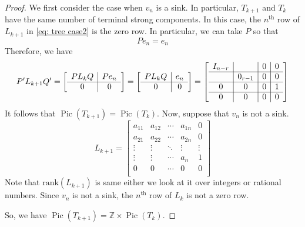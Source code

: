 \documentclass[11pt,reqno]{amsart}
\DeclareMathOperator{\Pic}{Pic}
\theoremstyle{definition}
\theoremstyle{plain}
\begin{document}
\begin{proof}
We first consider the case when $v_n$ is a sink. In particular, $T_{k+1}$ and $T_{k}$ have the same number of terminal strong components. In this case, the $n^{\textrm{th}}$ row of $L_{k+1}$ in \eqref{eq: tree case2} is the zero row. In particular, we can take $P$ so that
\begin{equation}
Pe_n=e_n
\end{equation}
Therefore, we have
\begin{equation}
P'L_{k+1}Q' = \left[\begin{array}{c|c}
	PL_kQ & Pe_n \\ \hline
	0 & 0
\end{array}\right] =\left[\begin{array}{c|c}
PL_kQ & e_n \\ \hline
0 & 0
\end{array}\right] =\left[\begin{array}{c|c|c|c}
I_{n-r} & & 0&0\\ \hline
   &0_{r-1} &0& 0\\ \hline
0 &0& 0&1\\ \hline
0 &0& 0&0\\
\end{array}\right]
\end{equation}
It follows that $\Pic(T_{k+1})=\Pic(T_k)$. Now, suppose that $v_n$ is not a sink.
\begin{equation}\label{eq: tree case3}
L_{k+1}=	\left[\begin{array}{ccc|c|c}
		a_{11}&a_{12}&\cdots &a_{1n}&0\\
		a_{21}&a_{22}&\cdots &a_{2n}&0\\
		\vdots & \vdots &\ddots & \vdots & \vdots \\ \hline
		\vdots & \vdots & \cdots&a_n & 1\\ \hline
		0&0&\cdots &0&0\\
	\end{array}\right]
\end{equation}
Note that $\textrm{rank}(L_{k+1})$ is same either we look at it over integers or rational numbers. Since $v_n$ is not a sink, the $n^{\textrm{th}}$ row of $L_k$ is not a zero row.

So, we have $\Pic(T_{k+1})=\mathbb{Z}\times \Pic(T_k)$.

\end{proof}
\end{document}
